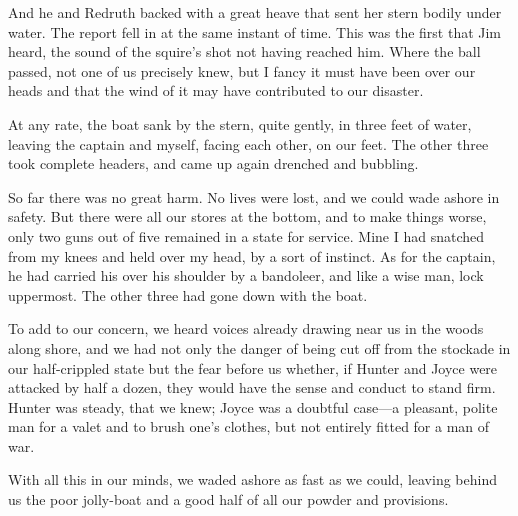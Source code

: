 And he and Redruth backed with a great heave that sent her stern bodily under water. The report fell in at the same instant of time. This was the first that Jim heard, the sound of the squire's shot not having reached him. Where the ball passed, not one of us precisely knew, but I fancy it must have been over our heads and that the wind of it may have contributed to our disaster.

At any rate, the boat sank by the stern, quite gently, in three feet of water, leaving the captain and myself, facing each other, on our feet. The other three took complete headers, and came up again drenched and bubbling.

So far there was no great harm. No lives were lost, and we could wade ashore in safety. But there were all our stores at the bottom, and to make things worse, only two guns out of five remained in a state for service. Mine I had snatched from my knees and held over my head, by a sort of instinct. As for the captain, he had carried his over his shoulder by a bandoleer, and like a wise man, lock uppermost. The other three had gone down with the boat.

To add to our concern, we heard voices already drawing near us in the woods along shore, and we had not only the danger of being cut off from the stockade in our half-crippled state but the fear before us whether, if Hunter and Joyce were attacked by half a dozen, they would have the sense and conduct to stand firm. Hunter was steady, that we knew; Joyce was a doubtful case—a pleasant, polite man for a valet and to brush one's clothes, but not entirely fitted for a man of war.

With all this in our minds, we waded ashore as fast as we could, leaving behind us the poor jolly-boat and a good half of all our powder and provisions.